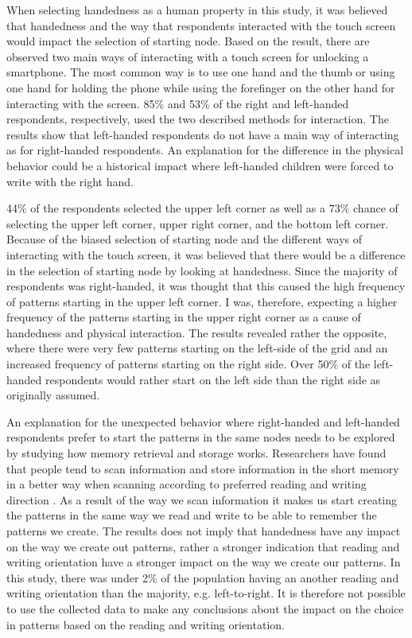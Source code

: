     When selecting handedness as a human property in this study, it was believed that handedness and the way that respondents interacted with the touch screen would impact the selection of starting node. Based on the result, there are observed two main ways of interacting with a touch screen for unlocking a smartphone. The most common way is to use one hand and the thumb or using one hand for holding the phone while using the forefinger on the other hand for interacting with the screen. 85\% and 53\% of the right and left-handed respondents, respectively, used the two described methods for interaction. The results show that left-handed respondents do not have a main way of interacting as for right-handed respondents. An explanation for the difference in the physical behavior could be a historical impact where left-handed children were forced to write with the right hand.

    44\% of the respondents selected the upper left corner as well as a 73\% chance of selecting the upper left corner, upper right corner, and the bottom left corner. Because of the biased selection of starting node and the different ways of interacting with the touch screen, it was believed that there would be a difference in the selection of starting node by looking at handedness. Since the majority of respondents was right-handed, it was thought that this caused the high frequency of patterns starting in the upper left corner. I was, therefore, expecting a higher frequency of the patterns starting in the upper right corner as a cause of handedness and physical interaction. The results revealed rather the opposite, where there were very few patterns starting on the left-side of the grid and an increased frequency of patterns starting on the right side. Over 50\% of the left-handed respondents would rather start on the left side than the right side as originally assumed.  

    An explanation for the unexpected behavior where right-handed and left-handed respondents prefer to start the patterns in the same nodes needs to be explored by studying how memory retrieval and storage works. Researchers have found that people tend to scan information and store information in the short memory in a better way when scanning according to preferred reading and writing direction \cite{Chan}. As a result of the way we scan information it makes us start creating the patterns in the same way we read and write to be able to remember the patterns we create. The results does not imply that handedness have any impact on the way we create out patterns, rather a stronger indication that reading and writing orientation have a stronger impact on the way we create our patterns. In this study, there was under 2\% of the population having an another reading and writing orientation than the majority, e.g. left-to-right. It is therefore not possible to use the collected data to make any conclusions about the impact on the choice in patterns based on the reading and writing orientation.

